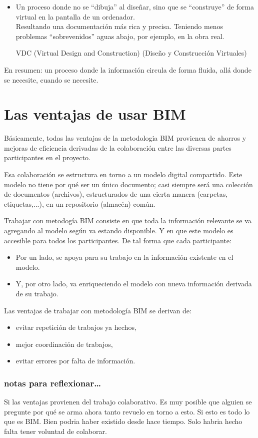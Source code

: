 \documentclass[spanish,12pt,a4paper,final,oneside]{book}
\begin{document}
\begin{itemize}
\item Un proceso donde no se ``dibuja'' al diseñar, sino que se ``construye'' de forma virtual en la pantalla de un ordenador.
\\ Resultando una documentación más rica y precisa. Teniendo menos problemas ``sobrevenidos'' aguas abajo, por ejemplo, en la obra real.

VDC (Virtual Design and Construction) (Diseño y Construcción Virtuales)


\end{itemize}

En resumen: un proceso donde la información circula de forma fluida, allá donde se necesite, cuando se necesite.



\section{Las ventajas de usar BIM}
Básicamente, todas las ventajas de la metodologia BIM provienen de ahorros y mejoras de eficiencia derivadas de la colaboración entre las diversas partes participantes en el proyecto.

Esa colaboración se estructura en torno a un modelo digital compartido. Este modelo no tiene por qué ser un único documento; casi siempre será una colección de documentos (archivos), estructurados de una cierta manera (carpetas, etiquetas,...), en un repositorio (almacén) común.

Trabajar con metodogía BIM consiste en que toda la información relevante se va agregando al modelo según va estando disponible. Y en que este modelo es accesible para todos los participantes. De tal forma que cada participante:
\begin{itemize}
\item Por un lado, se apoya para su trabajo en la información existente en el modelo.
\item Y, por otro lado, va enriqueciendo el modelo con nueva información derivada de su trabajo.
\end{itemize}
Las ventajas de trabajar con metodología BIM se derivan de:
\begin{itemize}
\item evitar repetición de trabajos ya hechos,
\item mejor coordinación de trabajos, 
\item evitar errores por falta de información.
\end{itemize}

\subsubsection{notas para reflexionar\ldots}
Si las ventajas provienen del trabajo colaborativo. Es muy posible que alguien se pregunte por qué se arma ahora tanto revuelo en torno a esto. Si esto es todo lo que es BIM. Bien podria haber existido desde hace tiempo. Solo habria hecho falta tener voluntad de colaborar.
\end{document}
